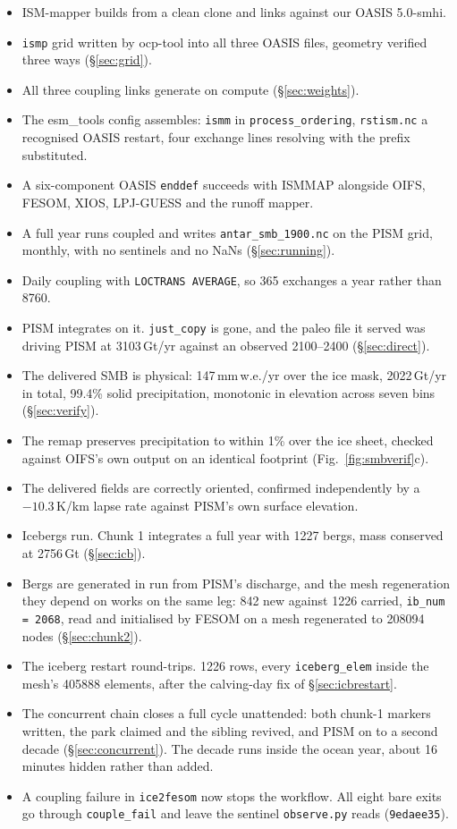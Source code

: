 \documentclass[11pt,a4paper]{article}
\newcommand{\code}[1]{\texttt{\small #1}}
\begin{document}
\begin{itemize}
\item ISM-mapper builds from a clean clone and links against our OASIS 5.0-smhi.
\item \code{ismp} grid written by ocp-tool into all three OASIS files, geometry verified three
      ways (\S\ref{sec:grid}).
\item All three coupling links generate on compute (\S\ref{sec:weights}).
\item The esm\_tools config assembles: \code{ismm} in \code{process\_ordering}, \code{rstism.nc}
      a recognised OASIS restart, four exchange lines resolving with the prefix substituted.
\item A six-component OASIS \code{enddef} succeeds with ISMMAP alongside OIFS, FESOM, XIOS,
      LPJ-GUESS and the runoff mapper.
\item A full year runs coupled and writes \code{antar\_smb\_1900.nc} on the PISM grid, monthly,
      with no sentinels and no NaNs (\S\ref{sec:running}).
\item Daily coupling with \code{LOCTRANS AVERAGE}, so 365 exchanges a year rather than 8760.
\item PISM integrates on it. \code{just\_copy} is gone, and the paleo file it served was driving
      PISM at 3103\,Gt/yr against an observed 2100--2400 (\S\ref{sec:direct}).
\item The delivered SMB is physical: 147\,mm\,w.e./yr over the ice mask, 2022\,Gt/yr in total,
      99.4\% solid precipitation, monotonic in elevation across seven bins (\S\ref{sec:verify}).
\item The remap preserves precipitation to within 1\% over the ice sheet, checked against OIFS's
      own output on an identical footprint (Fig.~\ref{fig:smbverif}c).
\item The delivered fields are correctly oriented, confirmed independently by a $-10.3$\,K/km
      lapse rate against PISM's own surface elevation.
\item Icebergs run. Chunk 1 integrates a full year with 1227 bergs, mass conserved at 2756\,Gt
      (\S\ref{sec:icb}).
\item Bergs are generated in run from PISM's discharge, and the mesh regeneration they depend on
      works on the same leg: 842 new against 1226 carried, \code{ib\_num = 2068}, read and
      initialised by FESOM on a mesh regenerated to 208094 nodes (\S\ref{sec:chunk2}).
\item The iceberg restart round-trips. 1226 rows, every \code{iceberg\_elem} inside the mesh's
      405888 elements, after the calving-day fix of \S\ref{sec:icbrestart}.
\item The concurrent chain closes a full cycle unattended: both chunk-1 markers written, the park
      claimed and the sibling revived, and PISM on to a second decade
      (\S\ref{sec:concurrent}). The decade runs inside the ocean year, about 16 minutes hidden
      rather than added.
\item A coupling failure in \code{ice2fesom} now stops the workflow. All eight bare exits go
      through \code{couple\_fail} and leave the sentinel \code{observe.py} reads
      (\code{9edaee35}).
\end{itemize}
\end{document}
